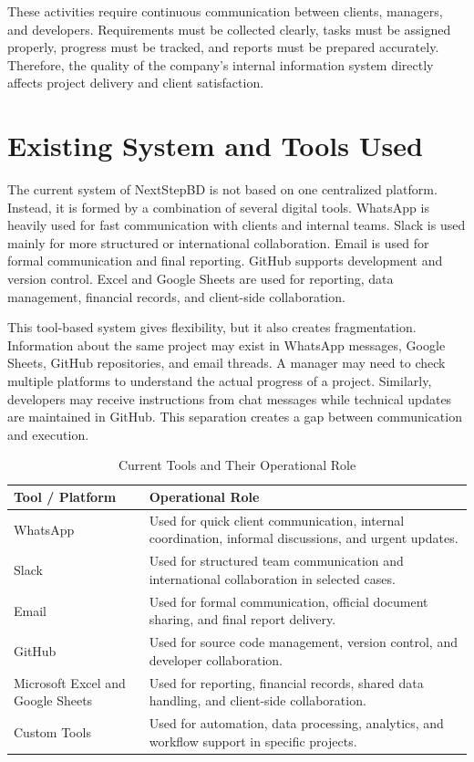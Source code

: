 \documentclass[12pt,a4paper]{report}
\begin{document}
These activities require continuous communication between clients, managers, and developers. Requirements must be collected clearly, tasks must be assigned properly, progress must be tracked, and reports must be prepared accurately. Therefore, the quality of the company’s internal information system directly affects project delivery and client satisfaction.

\section{Existing System and Tools Used}

The current system of NextStepBD is not based on one centralized platform. Instead, it is formed by a combination of several digital tools. WhatsApp is heavily used for fast communication with clients and internal teams. Slack is used mainly for more structured or international collaboration. Email is used for formal communication and final reporting. GitHub supports development and version control. Excel and Google Sheets are used for reporting, data management, financial records, and client-side collaboration.

This tool-based system gives flexibility, but it also creates fragmentation. Information about the same project may exist in WhatsApp messages, Google Sheets, GitHub repositories, and email threads. A manager may need to check multiple platforms to understand the actual progress of a project. Similarly, developers may receive instructions from chat messages while technical updates are maintained in GitHub. This separation creates a gap between communication and execution.

\begin{table}[H]
\centering
\caption{Current Tools and Their Operational Role}
\renewcommand{\arraystretch}{1.3}
\begin{tabularx}{\textwidth}{|p{4cm}|X|}
\hline
\rowcolor{secondary}
\textbf{Tool / Platform} & \textbf{Operational Role} \\
\hline
WhatsApp & Used for quick client communication, internal coordination, informal discussions, and urgent updates. \\
\hline
Slack & Used for structured team communication and international collaboration in selected cases. \\
\hline
Email & Used for formal communication, official document sharing, and final report delivery. \\
\hline
GitHub & Used for source code management, version control, and developer collaboration. \\
\hline
Microsoft Excel and Google Sheets & Used for reporting, financial records, shared data handling, and client-side collaboration. \\
\hline
Custom Tools & Used for automation, data processing, analytics, and workflow support in specific projects. \\
\hline
\end{tabularx}
\end{table}
\end{document}
